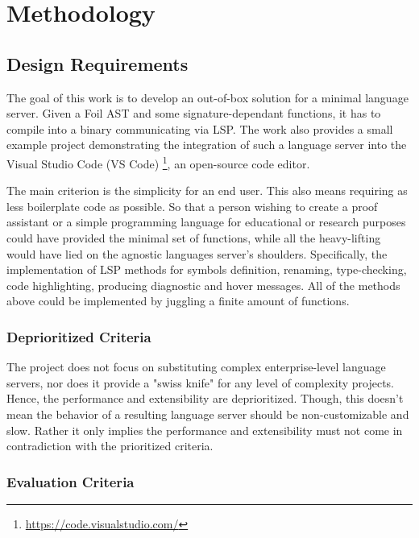 \chapter{Methodology}
\label{chap:met}

\section{Design Requirements}

The goal of this work is to develop an out-of-box solution for a minimal language server. 
Given a Foil AST and some signature-dependant functions, it has to compile into a binary communicating via LSP. 
The work also provides a small example project demonstrating the integration of such a language server into the Visual Studio Code (VS Code) \footnote{\url{https://code.visualstudio.com/}}, an open-source code editor.

The main criterion is the simplicity for an end user. 
This also means requiring as less boilerplate code as possible. 
So that a person wishing to create a proof assistant or a simple programming language for educational or research purposes could have provided the minimal set of functions, while all the heavy-lifting would have lied on the agnostic languages server's shoulders. 
Specifically, the implementation of LSP methods for symbols definition, renaming, type-checking, code highlighting, producing diagnostic and hover messages. 
All of the methods above could be implemented by juggling a finite amount of functions.

\subsection{Deprioritized Criteria}

The project does not focus on substituting complex enterprise-level language servers, nor does it provide a "swiss knife" for any level of complexity projects. 
Hence, the performance and extensibility are deprioritized.
Though, this doesn't mean the behavior of a resulting language server should be non-customizable and slow. 
Rather it only implies the performance and extensibility must not come in contradiction with the prioritized criteria.

\subsection{Evaluation Criteria}
\label{subsec:evaluation_criteria}

